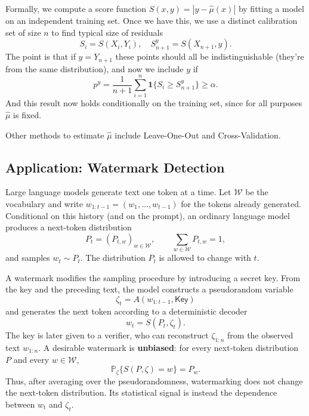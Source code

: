 Formally, we compute a score function $S(x, y) = |y - \hat{\mu}(x)|$ by fitting a model on an independent training set. Once we have this, we use a distinct calibration set of size $n$ to find typical size of residuals
\[
S_i = S(X_i, Y_i), \quad S^y_{n+1} = S(X_{n+1}, y).
\]
The point is that if $y = Y_{n+1}$ these points should all be indistinguishable (they're from the same distribution), and now we include $y$ if
\[
p^y = \frac{1}{n+1} \sum_{i=1}^{n} \mathbf{1}\{S_i \geq S^y_{n+1}\} \geq \alpha.
\]
And this result now holds conditionally on the training set, since for all purposes $\hat{\mu}$ is fixed.

\begin{rem}
    Other methods to estimate $\hat{\mu}$ include Leave-One-Out and Cross-Validation.
\end{rem}


\subsection{Application: Watermark Detection}
Large language models generate text one token at a time. Let $\mathcal{W}$ be the
vocabulary and write $w_{1:t-1}=(w_1,\ldots,w_{t-1})$ for the tokens already
generated. Conditional on this history (and on the prompt), an ordinary language
model produces a next-token distribution
\[
    P_t=(P_{t,w})_{w\in\mathcal{W}},
    \qquad \sum_{w\in\mathcal{W}}P_{t,w}=1,
\]
and samples $w_t\sim P_t$. The distribution $P_t$ is allowed to change with $t$.

A watermark modifies the sampling procedure by introducing a secret key. From
the key and the preceding text, the model constructs a pseudorandom variable
\[
    \zeta_t=A(w_{1:t-1},\mathsf{Key})
\]
and generates the next token according to a deterministic decoder
\[
    w_t=S(P_t,\zeta_t).
\]
The key is later given to a verifier, who can reconstruct $\zeta_{1:n}$ from the
observed text $w_{1:n}$. A desirable watermark is \textbf{unbiased}: for every
next-token distribution $P$ and every $w\in\mathcal{W}$,
\[
    \mathbb{P}_{\zeta}\{S(P,\zeta)=w\}=P_w.
\]
Thus, after averaging over the pseudorandomness, watermarking does not change the
next-token distribution. Its statistical signal is instead the dependence between
$w_t$ and $\zeta_t$.

